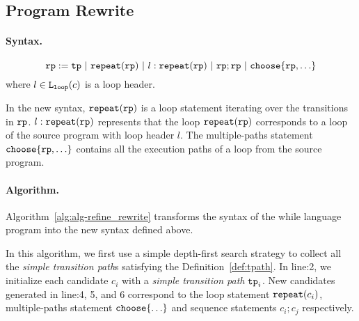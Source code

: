 \subsection{Program Rewrite}
\paragraph{Syntax.}

\[
    \rprog := \tpath ~|~ \rprepeat(\rprog) ~|~ l : \rprepeat(\rprog) ~|~ \rprog;\rprog ~|~ \rpchoose{\rprog, \ldots} 
\]
where $l\in \mathtt{L}_{\mathtt{loop}}(c)$ is a loop header.

In the new syntax, $\mathtt{repeat}(\mathtt{rp})$ is a loop statement iterating over the transitions in $\mathtt{rp}$.
$l: \mathtt{repeat}(\mathtt{rp})$ represents that the loop $ \mathtt{repeat}(\mathtt{rp})$
corresponds to a loop of the source program with loop header $l$.
The multiple-paths statement $\rpchoose{\rprog, \ldots} $ contains all the execution paths of a loop from the source program.


\paragraph{Algorithm.}
Algorithm~\ref{alg:alg-refine_rewrite} transforms the syntax of the while language program 
into the new syntax defined above.

In this algorithm, we first use a simple depth-first search strategy to collect all the \emph{simple transition path}s satisfying the Definition~\ref{def:tpath}. 
In line:2, we initialize each candidate $c_i$ with a \emph{simple transition path} $\mathtt{tp}_i$. 
New candidates generated in line:4, 5, and 6 correspond to the loop statement $\mathtt{repeat}(c_i)$, multiple-paths statement $\rpchoose{\ldots}$ and sequence statements $c_i; c_j$ respectively.

